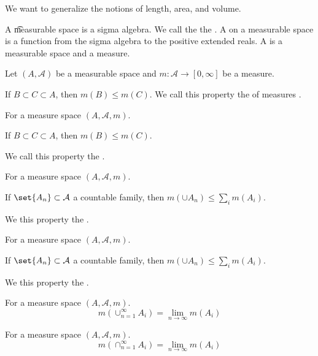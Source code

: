 
We want to generalize the notions of length, area, and volume.


A \t{measurable space}
is a sigma algebra.
We call the
the .
A
on a measurable space
is a function from the sigma algebra
to the positive extended reals.
A
is a measurable space and a measure.



\begin{prop}
Let $(A, \mathcal{A} )$ be a measurable space and
$m: \mathcal{A}  \to [0, \infty]$ be a measure.

If $B \subset C \subset A$, then $m(B) \leq m(C)$.
We call this property the of measures
.
\end{prop}

\begin{prop}
For a measure space $(A, \mathcal{A} , m)$.

If $B \subset C \subset A$, then $m(B) \leq m(C)$.

We call this property the
.
\end{prop}

\begin{prop}
For a measure space $(A, \mathcal{A} , m)$.

If $\set{A_n} \subset \mathcal{A} $ a countable family,
then $m(\cup A_n) \leq \sum_{i} m(A_i)$.

We this property the
.
\end{prop}

\begin{prop}
For a measure space $(A, \mathcal{A} , m)$.

If $\set{A_n} \subset \mathcal{A} $ a countable family,
then $m(\cup A_n) \leq \sum_{i} m(A_i)$.

We this property the
.
\end{prop}

\begin{prop}
For a measure space $(A, \mathcal{A} , m)$.
      \[
m(\cup_{n = 1}^{\infty} A_i) = \lim_{n \to \infty} m(A_i)
      \]
\end{prop}

\begin{prop}
For a measure space $(A, \mathcal{A} , m)$.
    \[
m(\cap _{n = 1}^{\infty} A_i) = \lim_{n \to \infty} m(A_i)
    \]
\end{prop}

